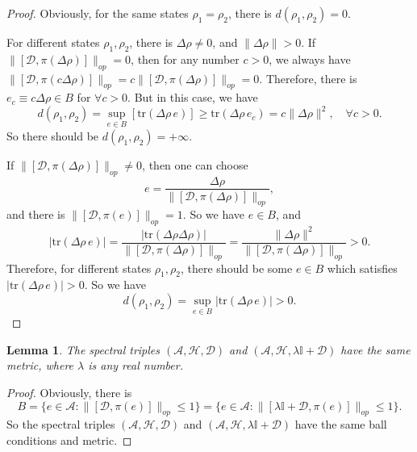 \documentclass[a4paper,12pt]{article}
\newtheorem{lemma}{Lemma}
\begin{document}
\begin{proof}
Obviously, for the same states $\rho_1 = \rho_2$,
there is $d (\rho_1, \rho_2) = 0$.

For different states $\rho_1, \rho_2$, there is $\Delta \rho \neq 0$, and $\|
\Delta \rho \| > 0$. If $\|[\mathcal{D}, \pi (\Delta \rho)]\|_{op} = 0$, then
for any number $c > 0$, we always have $\|[\mathcal{D}, \pi (c \Delta
\rho)]\|_{op} = c \|[\mathcal{D}, \pi (\Delta \rho)]\|_{op} = 0$. Therefore,
there is $e_c \equiv c \Delta \rho \in B$ for $\forall c > 0$. But in this
case, we have
\begin{equation}
  d (\rho_1, \rho_2) = \sup_{e \in B} [\mathrm{tr} (\Delta \rho
  \, e)] \geqslant \mathrm{tr} (\Delta \rho \, e_c)
  = c \| \Delta \rho \|^2, \quad \forall c > 0.
\end{equation}
So there should be $d (\rho_1, \rho_2) = + \infty$.

If $\|[\mathcal{D}, \pi (\Delta \rho)]\|_{op} \neq 0$, then one can choose
\begin{equation}
  e = \frac{\Delta \rho}{\|[\mathcal{D}, \pi (\Delta \rho)]\|_{op}},
\end{equation}
and there is $\|[\mathcal{D}, \pi (e)]\|_{op} = 1$. So we have $e \in B$, and
\begin{equation}
  | \mathrm{tr} (\Delta \rho \, e) | = \frac{| \mathrm{tr}
  (\Delta \rho \Delta \rho) |}{\|[\mathcal{D}, \pi (\Delta \rho)]\|_{op}} = \frac{\| \Delta \rho \|^2}{\|[\mathcal{D}, \pi (\Delta
  \rho)]\|_{op}} > 0.
\end{equation}
Therefore, for different states $\rho_1, \rho_2$, there should be some $e \in
B$ which satisfies $| \mathrm{tr} (\Delta \rho \, e) | > 0$. So
we have
\begin{equation}
  d (\rho_1, \rho_2) = \sup_{e \in B} | \mathrm{tr} (\Delta \rho
  \, e) | > 0.
\end{equation}
\end{proof}

\begin{lemma}
  The spectral triples $(\mathcal{A}, \mathcal{H}, \mathcal{D})$ and
  $(\mathcal{A}, \mathcal{H}, \lambda \mathbb{I}+\mathcal{D})$ have the same
  metric, where $\lambda$ is any real number.
\end{lemma}

\begin{proof}
Obviously, there is
\begin{equation}
  B = \{e \in \mathcal{A}: \|[\mathcal{D}, \pi (e)]\|_{op} \leqslant 1\} = \{e
  \in \mathcal{A}: \|[\lambda \mathbb{I}+\mathcal{D}, \pi (e)]\|_{op}
  \leqslant 1\} .
\end{equation}
So the spectral triples $(\mathcal{A}, \mathcal{H}, \mathcal{D})$ and
$(\mathcal{A}, \mathcal{H}, \lambda \mathbb{I}+\mathcal{D})$ have the same
ball conditions and metric.
\end{proof}
\end{document}

